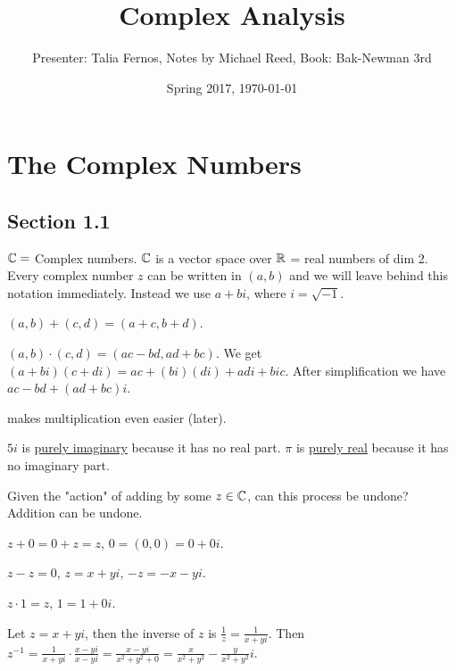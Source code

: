 \documentclass[]{article}
\author{Presenter: Talia Fernos, Notes by Michael Reed, Book: Bak-Newman 3rd}
\title{Complex Analysis}
\date{Spring 2017, \today}
\begin{document}
\maketitle

\section{The Complex Numbers}
\subsection{Section 1.1}
$\mathbb{C} = $ Complex numbers. $\mathbb{C}$ is a vector space over $\mathbb{R}$ = real numbers of dim 2. Every complex number $z$ can be written in  $(a,b)$ and we will leave behind this notation immediately. Instead we use $a+bi$, where $i=\sqrt{-1}$.
\begin{definition}
	[Addition] $(a,b)+(c,d)=(a+c,b+d)$.
\end{definition}
\begin{definition}
	[Multiplication] $(a,b)\cdot(c,d)=(ac-bd,ad+bc)$. We get $(a+bi)(c+di)=ac+(bi)(di)+adi+bic$. After simplification we have $ac-bd+(ad+bc)i$.
\end{definition}
\begin{definition}
	 makes multiplication even easier (later).
\end{definition}
\begin{example}
	$5i$ is \underline{purely imaginary} because it has no real part. $\pi$ is \underline{purely real} because it has no imaginary part.
\end{example}
\begin{example}
	Given the "action" of adding by some $z\in\mathbb{C}$, can this process be undone? Addition can be undone.%
\end{example}
\begin{definition}
	 $z+0=0+z=z$, $0=(0,0)=0+0i$.
\end{definition}
\begin{definition}
	 $z-z=0$, $z=x+yi$, $-z=-x-yi$.
\end{definition}
\begin{definition}
	 $z\cdot1=z$, $1=1+0i$.
\end{definition}
\begin{definition}
	 Let $z=x+yi$, then the inverse of $z$ is $\frac{1}{z}=\frac{1}{x+yi}$. Then $z^{-1}=\frac{1}{x+yi}\cdot\frac{x-yi}{x-yi}=\frac{x-yi}{x^2+y^2+0}=\frac{x}{x^2+y^2}-\frac{y}{x^2+y^2}i$.
\end{definition}
\end{document}
